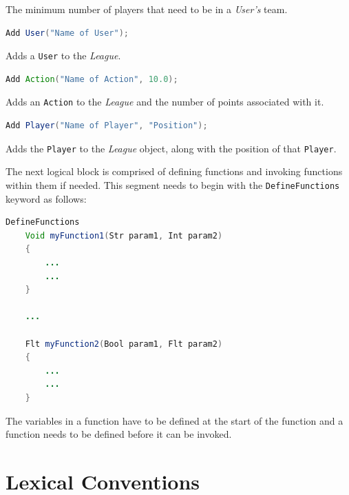 \documentclass[12pt]{report}
\begin{document}
The minimum number of players that need to be in a \textit{User's} team.

\begin{singlespace}
\begin{lstlisting}[language=Java,label=some-code,caption={Adding a \texttt{User}.}]
Add User("Name of User");
\end{lstlisting}
\end{singlespace}

Adds a \texttt{User} to the \textit{League}.

\begin{singlespace}
\begin{lstlisting}[language=Java,label=some-code,caption={Adding an \texttt{Action}.}]
Add Action("Name of Action", 10.0);
\end{lstlisting}
\end{singlespace}

Adds an \texttt{Action} to the \textit{League} and the number of points associated with it.

\begin{singlespace}
\begin{lstlisting}[language=Java,label=some-code,caption={Adding a \texttt{Player}.}]
Add Player("Name of Player", "Position");	
\end{lstlisting}
\end{singlespace}

Adds the \texttt{Player} to the \textit{League} object, along with the position of that \texttt{Player}.

The next logical block is comprised of defining functions and invoking functions within them if needed. This segment needs to begin with the \texttt{DefineFunctions} keyword as follows:

\begin{singlespace}
\begin{lstlisting}[language=Java,label=some-code,caption={Defining functions.}]
DefineFunctions
	Void myFunction1(Str param1, Int param2)
	{
		...
		...
	}

	...

	Flt myFunction2(Bool param1, Flt param2)
	{
		...
		...
	}
\end{lstlisting}
\end{singlespace}

The variables in a function have to be defined at the start of the function and a function needs to be defined before it can be invoked. 

\section{Lexical Conventions}
\end{document}
